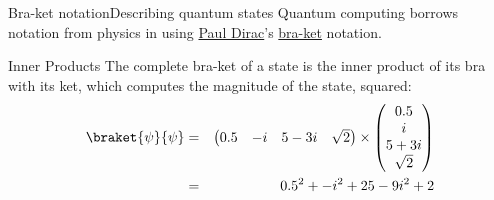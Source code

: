 \begin{frame}{Bra-ket notation}{Describing quantum states}
Quantum computing borrows notation from physics in using \href{https://en.wikipedia.org/wiki/Paul_Dirac}{Paul Dirac}'s \href{https://en.wikipedia.org/wiki/Bra-ket_notation}{bra-ket} notation.


\end{frame}

\begin{frame}{Inner Products}
The complete bra-ket of a state is the inner product of its bra with its ket, which computes the magnitude of the state, squared:
\begin{eqnarray*}
\braket{\psi}{\psi} & = &
\begin{pmatrix}
0.5 & -i & 5-3i &  \sqrt{2}
\end{pmatrix}
\times\begin{pmatrix}
0.5\\ i \\ 5+3i \\ \sqrt{2}
\end{pmatrix}
\\
 & = & 0.5^{2} + -i^{2} + 25-9i^{2} + 2 
\end{eqnarray*}
    
\end{frame}


